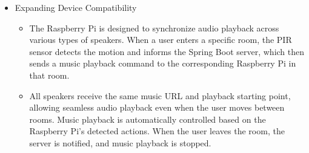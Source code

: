\documentclass[conference]{IEEEtran}
\begin{document}
\begin{itemize}
    \item Expanding Device Compatibility
\begin{itemize}
    \item The Raspberry Pi is designed to synchronize audio playback across various types of speakers. When a user enters a specific room, the PIR sensor detects the motion and informs the Spring Boot server, which then sends a music playback command to the corresponding Raspberry Pi in that room.\\
    \item All speakers receive the same music URL and playback starting point, allowing seamless audio playback even when the user moves between rooms. Music playback is automatically controlled based on the Raspberry Pi’s detected actions. When the user leaves the room, the server is notified, and music playback is stopped.\\
\end{itemize}
\end{itemize}
\end{document}

